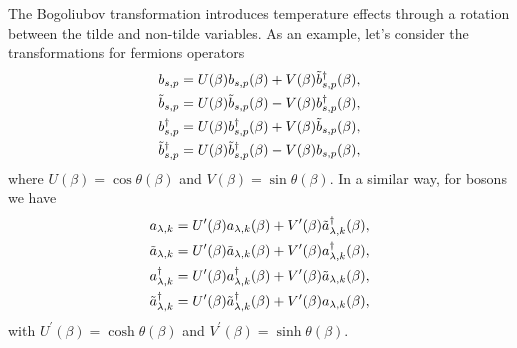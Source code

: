 \documentclass[11pt,showpacs,preprintnumbers,amsmath,amssymb,prd,nofootinbib,superscriptaddress]{revtex4-2}
\begin{document}
The Bogoliubov transformation introduces temperature effects through a rotation between the tilde and non-tilde variables. As an example, let's consider the transformations for fermions operators
\begin{eqnarray}
    b_{s,p}=U(\beta)b_{s,p}(\beta)+V(\beta)\Tilde{b}_{s,p}^\dagger(\beta),\nonumber\\
    \Tilde{b}_{s,p}=U(\beta)\Tilde{b}_{s,p}(\beta)-V(\beta)b_{s,p}^\dagger(\beta),\nonumber\\
    b_{s,p}^\dagger=U(\beta)b_{s,p}^\dagger(\beta)+V(\beta)\Tilde{b}_{s,p}(\beta),\nonumber\\
    \Tilde{b}_{s,p}^\dagger=U(\beta)\Tilde{b}_{s,p}^\dagger(\beta)-V(\beta)b_{s,p}(\beta),\label{boguferm}
\end{eqnarray}
where $U(\beta)=\cos{\theta}(\beta)$ and $V(\beta)=\sin{\theta}(\beta)$. In a similar way, for bosons we have 
\begin{eqnarray}
a_{\lambda,k}=U^\prime(\beta)a_{\lambda,k}(\beta)+V^\prime(\beta)\Tilde{a}_{\lambda,k}^\dagger(\beta),\nonumber\\
    \Tilde{a}_{\lambda,k}=U^\prime(\beta)\Tilde{a}_{\lambda,k}(\beta)+V^\prime(\beta)a_{\lambda,k}^\dagger(\beta),\nonumber\\
    a_{\lambda,k}^\dagger=U^\prime(\beta)a_{\lambda,k}^\dagger(\beta)+V^\prime(\beta)\Tilde{a}_{\lambda,k}(\beta),\nonumber\\
    \Tilde{a}_{\lambda,k}^\dagger=U^\prime(\beta)\Tilde{a}_{\lambda,k}^\dagger(\beta)+V^\prime(\beta)a_{\lambda,k}(\beta),\label{bogubos}
\end{eqnarray}
with $U^\prime(\beta)=\cosh{\theta}(\beta)$ and $V^\prime(\beta)=\sinh{\theta}(\beta)$.
\end{document}
